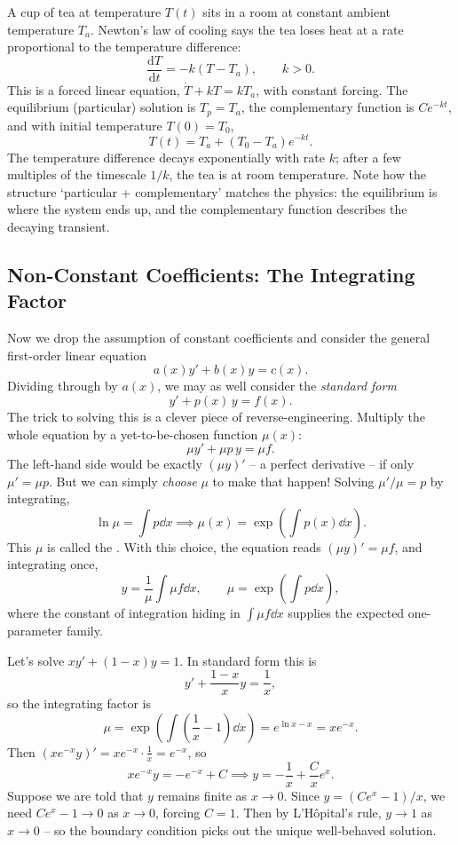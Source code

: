 \begin{example}
	A cup of tea at temperature $T(t)$ sits in a room at constant ambient temperature $T_a$. Newton's law of cooling says the tea loses heat at a rate proportional to the temperature difference:
	$$
	\frac{\mathrm{d}T}{\mathrm{d}t} = -k(T - T_a), \qquad k > 0.
	$$
	This is a forced linear equation, $\dot T + kT = kT_a$, with constant forcing. The equilibrium (particular) solution is $T_p = T_a$, the complementary function is $Ce^{-kt}$, and with initial temperature $T(0) = T_0$,
	$$
	T(t) = T_a + (T_0 - T_a)e^{-kt}.
	$$
	The temperature difference decays exponentially with rate $k$; after a few multiples of the timescale $1/k$, the tea is at room temperature. Note how the structure `particular + complementary' matches the physics: the equilibrium is where the system ends up, and the complementary function describes the decaying transient.
\end{example}

\subsection{Non-Constant Coefficients: The Integrating Factor}

Now we drop the assumption of constant coefficients and consider the general first-order linear equation
$$
a(x) y' + b(x) y = c(x).
$$
Dividing through by $a(x)$, we may as well consider the \emph{standard form}
$$
y' + p(x)\, y = f(x).
$$
The trick to solving this is a clever piece of reverse-engineering. Multiply the whole equation by a yet-to-be-chosen function $\mu(x)$:
$$
\mu y' + \mu p \, y = \mu f.
$$
The left-hand side would be exactly $(\mu y)'$ -- a perfect derivative -- if only $\mu' = \mu p$. But we can simply \emph{choose} $\mu$ to make that happen! Solving $\mu'/\mu = p$ by integrating,
$$
\ln \mu = \int p \dd x \implies \mu(x) = \exp\left(\int p(x) \dd x\right).
$$
This $\mu$ is called the . With this choice, the equation reads $(\mu y)' = \mu f$, and integrating once,
$$
y = \frac{1}{\mu}\int \mu f \dd x, \qquad \mu = \exp\left(\int p \dd x\right),
$$
where the constant of integration hiding in $\int \mu f \dd x$ supplies the expected one-parameter family.

\begin{example}
	Let's solve $x y' + (1 - x) y = 1$. In standard form this is
	$$
	y' + \frac{1 - x}{x} y = \frac{1}{x},
	$$
	so the integrating factor is
	$$
	\mu = \exp\left(\int \left(\frac{1}{x} - 1\right) \dd x\right) = e^{\ln x - x} = x e^{-x}.
	$$
	Then $(x e^{-x} y)' = x e^{-x} \cdot \frac 1x = e^{-x}$, so
	$$
	x e^{-x} y = -e^{-x} + C \implies y = -\frac{1}{x} + \frac{C}{x} e^{x}.
	$$
	Suppose we are told that $y$ remains finite as $x \to 0$. Since $y = (Ce^x - 1)/x$, we need $Ce^x - 1 \to 0$ as $x \to 0$, forcing $C = 1$. Then by L'H\^opital's rule, $y \to 1$ as $x \to 0$ -- so the boundary condition picks out the unique well-behaved solution.
\end{example}

